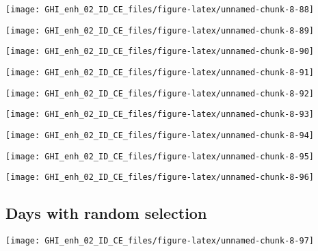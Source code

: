 \documentclass[
  10pt,
  a4paper,oneside]{article}
\begin{document}
\begin{center}\texttt{[image: GHI\_enh\_02\_ID\_CE\_files/figure-latex/unnamed-chunk-8-88]} \end{center}

\begin{center}\texttt{[image: GHI\_enh\_02\_ID\_CE\_files/figure-latex/unnamed-chunk-8-89]} \end{center}

\begin{center}\texttt{[image: GHI\_enh\_02\_ID\_CE\_files/figure-latex/unnamed-chunk-8-90]} \end{center}

\begin{center}\texttt{[image: GHI\_enh\_02\_ID\_CE\_files/figure-latex/unnamed-chunk-8-91]} \end{center}

\begin{center}\texttt{[image: GHI\_enh\_02\_ID\_CE\_files/figure-latex/unnamed-chunk-8-92]} \end{center}

\begin{center}\texttt{[image: GHI\_enh\_02\_ID\_CE\_files/figure-latex/unnamed-chunk-8-93]} \end{center}

\begin{center}\texttt{[image: GHI\_enh\_02\_ID\_CE\_files/figure-latex/unnamed-chunk-8-94]} \end{center}

\begin{center}\texttt{[image: GHI\_enh\_02\_ID\_CE\_files/figure-latex/unnamed-chunk-8-95]} \end{center}

\begin{center}\texttt{[image: GHI\_enh\_02\_ID\_CE\_files/figure-latex/unnamed-chunk-8-96]} \end{center}

\FloatBarrier

\hypertarget{days-with-random-selection}{%
\subsection{Days with random selection}\label{days-with-random-selection}}

\begin{center}\texttt{[image: GHI\_enh\_02\_ID\_CE\_files/figure-latex/unnamed-chunk-8-97]} \end{center}
\end{document}
